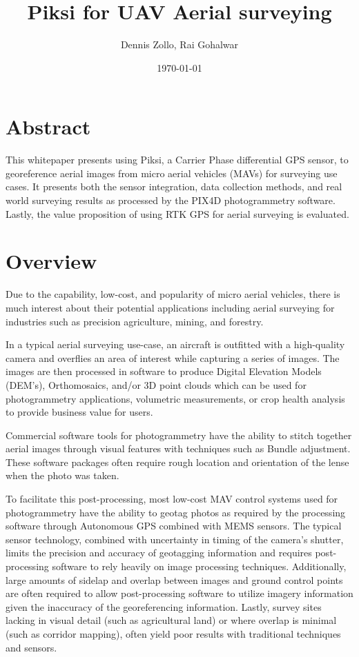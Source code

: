 \documentclass{article}
\title{Piksi for UAV Aerial surveying}
\author{Dennis Zollo, Rai Gohalwar}
\date{\today}
\begin{document}
\maketitle

\thispagestyle{firstpage}

\section{Abstract}
\label{sec:abstract}
This whitepaper presents using Piksi, a Carrier Phase differential GPS sensor, to georeference 
aerial images from micro aerial vehicles (MAVs) for surveying use cases.
It presents both the sensor integration, data collection methods, and real world surveying results 
as processed by the PIX4D photogrammetry software.  Lastly, the value proposition of using RTK GPS 
for aerial surveying is evaluated.
\tableofcontents
\newpage
\section{Overview}
\label{sec:Overview}
Due to the capability, low-cost, and popularity of micro aerial vehicles, there is much interest 
about their potential applications including aerial surveying for industries such as precision 
agriculture, mining, and forestry.

In a typical aerial surveying use-case, an aircraft is outfitted with a high-quality camera and 
overflies an area of interest while capturing a series of images.  The images are then processed in 
software to produce Digital Elevation Models (DEM's), Orthomosaics, and/or 3D point clouds which 
can be used for photogrammetry applications, volumetric measurements, or crop health analysis to 
provide business value for users.

Commercial software tools for photogrammetry have the ability to stitch together aerial images 
through visual features with techniques such as Bundle adjustment.  These software packages often 
require rough location and orientation of the lense when the photo was taken.

To facilitate this post-processing, most low-cost MAV control systems used for photogrammetry have 
the ability to geotag photos as required by the processing software through Autonomous GPS combined 
with MEMS sensors.  The typical sensor technology, combined with uncertainty in timing of the 
camera's shutter, limits the precision and accuracy of geotagging information and requires 
post-processing software to rely heavily on image processing techniques. Additionally, large 
amounts of sidelap and overlap between images and ground control points are often required to allow 
post-processing software to utilize imagery information given the inaccuracy of the georeferencing 
information.  Lastly, survey sites lacking in visual detail (such as agricultural land) or where 
overlap is minimal (such as corridor mapping), often yield poor results with traditional techniques 
and sensors.
\end{document}
